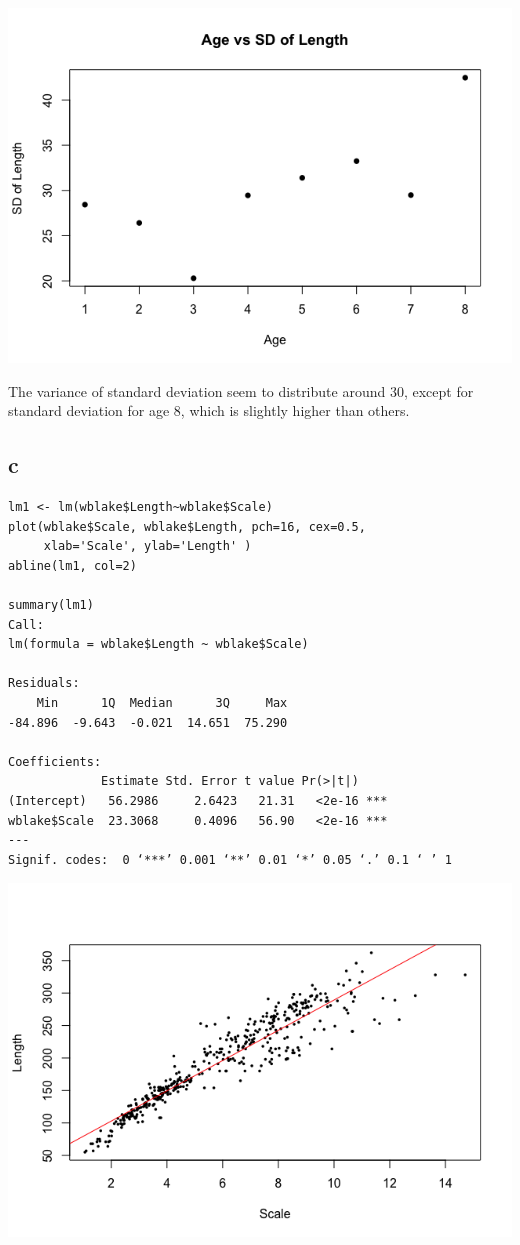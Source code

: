 \documentclass[11pt,letterpaper]{article}
\begin{document}
\includegraphics[scale=0.6]{1-b-1.png}

\noindent The variance of standard deviation seem to distribute around 30, except for standard deviation for age 8, which is slightly higher than others. 
\subsection*{c}
\begin{verbatim}
lm1 <- lm(wblake$Length~wblake$Scale)
plot(wblake$Scale, wblake$Length, pch=16, cex=0.5,
     xlab='Scale', ylab='Length' )
abline(lm1, col=2)

summary(lm1)
Call:
lm(formula = wblake$Length ~ wblake$Scale)

Residuals:
    Min      1Q  Median      3Q     Max 
-84.896  -9.643  -0.021  14.651  75.290 

Coefficients:
             Estimate Std. Error t value Pr(>|t|)    
(Intercept)   56.2986     2.6423   21.31   <2e-16 ***
wblake$Scale  23.3068     0.4096   56.90   <2e-16 ***
---
Signif. codes:  0 ‘***’ 0.001 ‘**’ 0.01 ‘*’ 0.05 ‘.’ 0.1 ‘ ’ 1
\end{verbatim}

\includegraphics[scale=0.6]{1-c-1.png}
\end{document}
